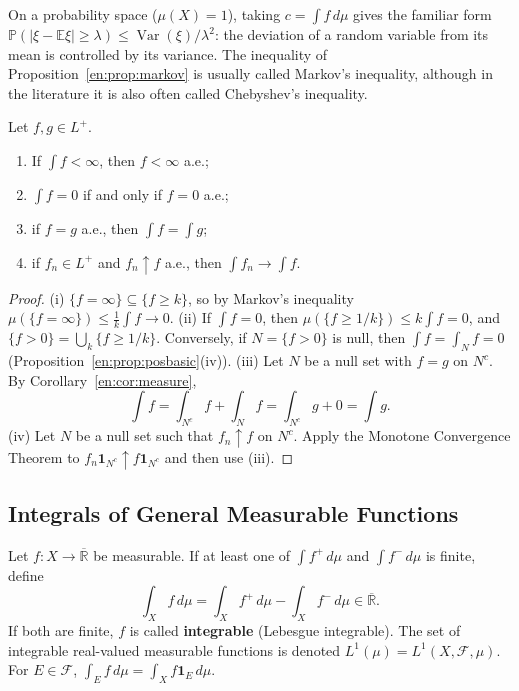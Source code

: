 \documentclass[11pt]{article}
\makeatletter
\newcommand{\envlabel}[1]{\protected@edef\@currentlabel{\themathenv}\label{#1}}
\makeatother
\begin{document}
On a probability space ($\mu(X)=1$), taking $c=\int f\,d\mu$ gives the familiar form $\mathbb{P}(|\xi-\mathbb{E}\xi|\geq\lambda)\leq\operatorname{Var}(\xi)/\lambda^{2}$: the deviation of a random variable from its mean is controlled by its variance. The inequality of Proposition~\ref{en:prop:markov} is usually called Markov's inequality, although in the literature it is also often called Chebyshev's inequality.

\begin{corollary}\envlabel{en:cor:ae}
Let $f,g\in L^{+}$.
\begin{enumerate}
  \item If $\int f<\infty$, then $f<\infty$ a.e.;
  \item $\int f=0$ if and only if $f=0$ a.e.;
  \item if $f=g$ a.e., then $\int f=\int g$;
  \item if $f_{n}\in L^{+}$ and $f_{n}\uparrow f$ a.e., then $\int f_{n}\to\int f$.
\end{enumerate}
\end{corollary}

\begin{proof}
(i) $\{f=\infty\}\subseteq\{f\geq k\}$, so by Markov's inequality $\mu(\{f=\infty\})\leq\frac1k\int f\to0$. (ii) If $\int f=0$, then $\mu(\{f\geq1/k\})\leq k\int f=0$, and $\{f>0\}=\bigcup_{k}\{f\geq1/k\}$. Conversely, if $N=\{f>0\}$ is null, then $\int f=\int_{N}f=0$ (Proposition~\ref{en:prop:posbasic}(iv)). (iii) Let $N$ be a null set with $f=g$ on $N^{c}$. By Corollary~\ref{en:cor:measure},
\[
\int f=\int_{N^{c}}f+\int_{N}f=\int_{N^{c}}g+0=\int g.
\]
(iv) Let $N$ be a null set such that $f_{n}\uparrow f$ on $N^{c}$. Apply the Monotone Convergence Theorem to $f_{n}\mathbf{1}_{N^{c}}\uparrow f\mathbf{1}_{N^{c}}$ and then use (iii).
\end{proof}

\subsection{Integrals of General Measurable Functions}

\begin{definition}\envlabel{en:def:integral}
Let $f:X\to\overline{\mathbb{R}}$ be measurable. If at least one of $\int f^{+}\,d\mu$ and $\int f^{-}\,d\mu$ is finite, define
\[
\int_{X}f\,d\mu=\int_{X}f^{+}\,d\mu-\int_{X}f^{-}\,d\mu\in\overline{\mathbb{R}}.
\]
If both are finite, $f$ is called \textbf{integrable} (Lebesgue integrable). The set of integrable real-valued measurable functions is denoted $L^{1}(\mu)=L^{1}(X,\mathcal{F},\mu)$. For $E\in\mathcal{F}$, $\int_{E}f\,d\mu=\int_{X}f\mathbf{1}_{E}\,d\mu$.
\end{definition}
\end{document}
